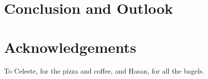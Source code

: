 \documentclass[tog]{acmsiggraph}
\begin{document}
%

\section{Conclusion and Outlook} %











%

\section*{Acknowledgements}

To Celeste, for the pizza and coffee, and Hasan, for all the bagels.


\nocite{*}

\end{document}

